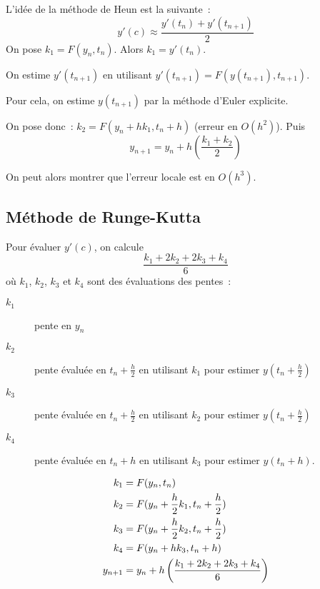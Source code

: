 L'idée de la méthode de Heun est la suivante~:
\begin{equation*}
  y'(c)\approx \frac{y'(t_{n})+y'(t_{n+1})}{2}
\end{equation*}
On pose $\boxed{k_{1} = F(y_{n},t_{n})}$.
Alors $k_{1} = y'(t_{n})$.

On estime $y'(t_{n+1})$ en utilisant $y'(t_{n+1}) = F(y(t_{n+1}),
t_{n+1})$.

Pour cela, on estime $y(t_{n+1})$ par la méthode d'Euler
explicite.

On pose donc~: $\boxed{k_{2} = F(y_{n}+hk_{1},t_{n}+h)}$ (erreur en $O(h^{2})$).
Puis
\begin{equation*}
  \boxed{y_{n+1} = y_{n} + h
\left(
  \frac{k_{1}+k_{2}}{2}
\right)}
\end{equation*}


On peut alors montrer que l'erreur locale est en $O(h^{3})$.


\subsection{Méthode de Runge-Kutta}

Pour évaluer $y'(c)$, on calcule
\begin{equation*}
  \frac{k_{1} + 2 k_{2} + 2 k_{3} + k_{4}}{6}
\end{equation*}
où $k_{1}$, $k_{2}$, $k_{3}$ et $k_{4}$ sont des évaluations des
pentes~:
\begin{description}
\item[$k_{1}$] pente en $y_{n}$
\item[$k_2$] pente évaluée en $t_{n}+\frac{h}{2}$ en utilisant $k_{1}$
  pour estimer $y(t_{n}+\frac{h}{2})$
\item[$k_3$] pente évaluée en $t_{n}+\frac{h}{2}$ en utilisant $k_{2}$
  pour estimer $y(t_{n}+\frac{h}{2})$
\item[$k_4$] pente évaluée en $t_{n}+h$ en utilisant $k_{3}$ pour
  estimer $y(t_{n}+h)$.
\end{description}
\begin{align*}
  k_{1} &= F(y_{n}, t_{n})\\
  k_{2} &= F(y_{n} + \frac{h}{2}k_{1},t_{n} + \frac{h}{2})\\
  k_{3} &= F(y_{n} + \frac{h}{2}k_{2},t_{n}+ \frac{h}{2})\\
  k_{4} &= F(y_{n}+h k_{3},t_{n}+h)\\
  y_{n+1} &= y_{n} +h \left(\frac{k_{1}+2k_{2}+2k_{3}+k_{4}}{6}\right)
\end{align*}


